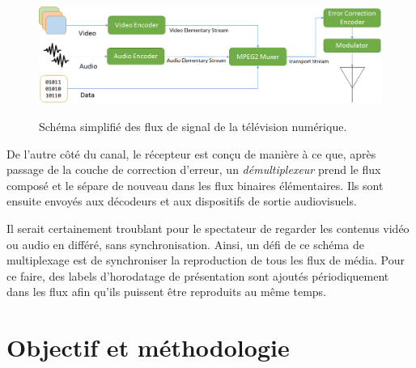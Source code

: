 \documentclass[12pt,a4paper]{article}
\begin{document}
 \begin{figure}[!h]
\centering
\caption{Schéma simplifié des flux de signal de la télévision numérique.}
\includegraphics[width=1\linewidth]{pictures/diagrama_blocos_tvd.png}
\label{fig:diagrama_blocos_tvd}
\end{figure}
 

De l'autre côté du canal, le récepteur est conçu de manière à ce que, après passage de la couche de correction d'erreur, un \textit{démultiplexeur} prend le flux composé et le sépare de nouveau dans les flux binaires élémentaires. Ils sont ensuite envoyés aux décodeurs et aux dispositifs de sortie audiovisuels.

Il serait certainement troublant pour le spectateur de regarder les contenus vidéo ou audio en différé, sans synchronisation. Ainsi, un défi de ce schéma de multiplexage est de synchroniser la reproduction de tous les flux de média. Pour ce faire, des labels d'horodatage de présentation sont ajoutés périodiquement dans les flux afin qu'ils puissent être reproduits au même temps.

\section{Objectif et méthodologie}
\end{document}
